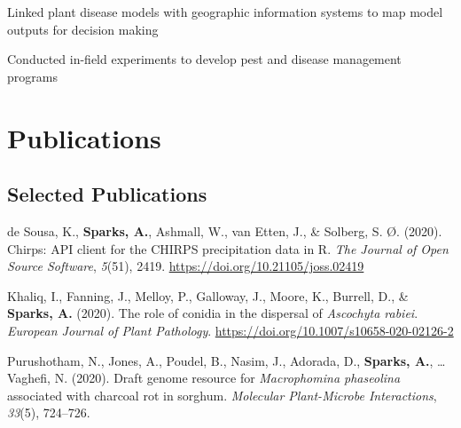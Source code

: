 \documentclass[11pt, a4paper]{awesome-cv}
\begin{document}
\begin{cventries}
{\begin{cvitems}
\item Linked plant disease models with geographic information systems to map model outputs for decision making
\item Conducted in-field experiments to develop pest and disease management programs
\end{cvitems}}
\end{cventries}

\hypertarget{publications}{%
\section{Publications}\label{publications}}

\hypertarget{selected-publications}{%
\subsection{Selected Publications}\label{selected-publications}}

\begingroup
\setlength{\parindent}{-0.5in}
\setlength{\leftskip}{0.5in}

\hypertarget{refs_articles}{}
\leavevmode\hypertarget{ref-deSousa2020}{}%
de Sousa, K., \textbf{Sparks, A.}, Ashmall, W., van Etten, J., \&
Solberg, S. Ø. (2020). Chirps: {API} client for the CHIRPS precipitation
data in {R}. \emph{The Journal of Open Source Software}, \emph{5}(51),
2419. \url{https://doi.org/10.21105/joss.02419}

\leavevmode\hypertarget{ref-khaliq_role_2020}{}%
Khaliq, I., Fanning, J., Melloy, P., Galloway, J., Moore, K., Burrell,
D., \& \textbf{Sparks, A.} (2020). The role of conidia in the dispersal
of \emph{{Ascochyta} rabiei}. \emph{European Journal of Plant
Pathology}. \url{https://doi.org/10.1007/s10658-020-02126-2}

\leavevmode\hypertarget{ref-Purushotham2020}{}%
Purushotham, N., Jones, A., Poudel, B., Nasim, J., Adorada, D.,
\textbf{Sparks, A.}, \ldots{} Vaghefi, N. (2020). Draft genome resource
for \emph{{Macrophomina} phaseolina} associated with charcoal rot in
sorghum. \emph{Molecular Plant-Microbe Interactions}, \emph{33}(5),
724--726.
\end{document}
